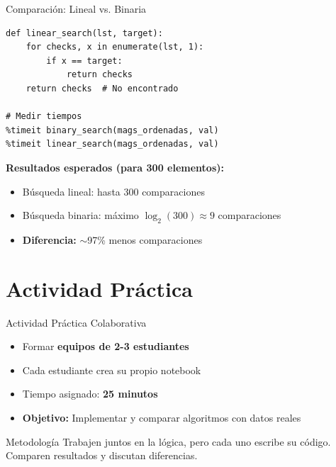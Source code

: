 \documentclass[10pt]{beamer}
\begin{document}
\begin{frame}[fragile]{Comparación: Lineal vs. Binaria}
\begin{verbatim}
def linear_search(lst, target):
    for checks, x in enumerate(lst, 1):
        if x == target:
            return checks
    return checks  # No encontrado

# Medir tiempos
%timeit binary_search(mags_ordenadas, val)
%timeit linear_search(mags_ordenadas, val)
\end{verbatim}

\vspace{0.3cm}
\textbf{Resultados esperados (para 300 elementos):}
\begin{itemize}
  \item Búsqueda lineal: hasta 300 comparaciones
  \item Búsqueda binaria: máximo $\log_2(300) \approx 9$ comparaciones
  \item \textbf{Diferencia:} $\sim$97\% menos comparaciones
\end{itemize}
\end{frame}

\section{Actividad Práctica}

\begin{frame}{Actividad Práctica Colaborativa}
  \begin{itemize}
    \item Formar \textbf{equipos de 2-3 estudiantes}
    \item Cada estudiante crea su propio notebook
    \item Tiempo asignado: \textbf{25 minutos}
    \item \textbf{Objetivo:} Implementar y comparar algoritmos con datos reales
  \end{itemize}
  
  \vspace{0.3cm}
  \begin{alertblock}{Metodología}
    Trabajen juntos en la lógica, pero cada uno escribe su código.
    Comparen resultados y discutan diferencias.
  \end{alertblock}
\end{frame}
\end{document}
